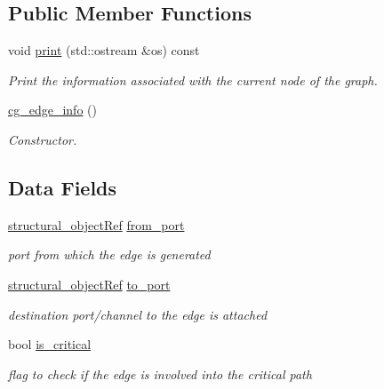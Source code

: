 \subsection*{Public Member Functions}
\begin{DoxyCompactItemize}
\item 
void \hyperlink{structcg__edge__info_aa13ae24ca61d06f84662a86227515b5d}{print} (std\+::ostream \&os) const
\begin{DoxyCompactList}\small\item\em Print the information associated with the current node of the graph. \end{DoxyCompactList}\item 
\hyperlink{structcg__edge__info_adeb30c819cc2b97c5190953c9232051c}{cg\+\_\+edge\+\_\+info} ()
\begin{DoxyCompactList}\small\item\em Constructor. \end{DoxyCompactList}\end{DoxyCompactItemize}
\subsection*{Data Fields}
\begin{DoxyCompactItemize}
\item 
\hyperlink{structural__objects_8hpp_a8ea5f8cc50ab8f4c31e2751074ff60b2}{structural\+\_\+object\+Ref} \hyperlink{structcg__edge__info_a995cf47a7796ebb3c558e8f870d2d30a}{from\+\_\+port}
\begin{DoxyCompactList}\small\item\em port from which the edge is generated \end{DoxyCompactList}\item 
\hyperlink{structural__objects_8hpp_a8ea5f8cc50ab8f4c31e2751074ff60b2}{structural\+\_\+object\+Ref} \hyperlink{structcg__edge__info_a26058bf2df2f23bbee962f60bb44a40f}{to\+\_\+port}
\begin{DoxyCompactList}\small\item\em destination port/channel to the edge is attached \end{DoxyCompactList}\item 
bool \hyperlink{structcg__edge__info_ae1d1e8a9ae7fbbca1bd609ddadabdc7f}{is\+\_\+critical}
\begin{DoxyCompactList}\small\item\em flag to check if the edge is involved into the critical path \end{DoxyCompactList}\end{DoxyCompactItemize}



